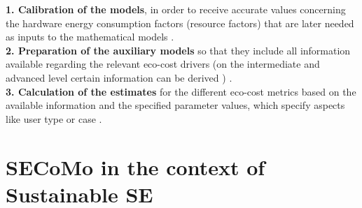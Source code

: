 \documentclass[oribibl]{llncs}
\begin{document}
\textbf{1. Calibration of the models}, in order to receive accurate values concerning the hardware energy consumption factors (resource factors) that are later needed as inputs to the mathematical models \cite{schulze_cost_2016}.\\ %
\textbf{2. Preparation of the auxiliary models} so that they include all information available regarding the relevant eco-cost drivers (on the intermediate and advanced level certain information can be derived%
	) \cite{schulze_cost_2016}.\\ %
\textbf{3. Calculation of the estimates} for the different eco-cost metrics based on the available information %
	and the specified parameter values, which specify aspects like user type or case \cite{schulze_cost_2016}.



\section{SECoMo in the context of Sustainable SE}
\end{document}
